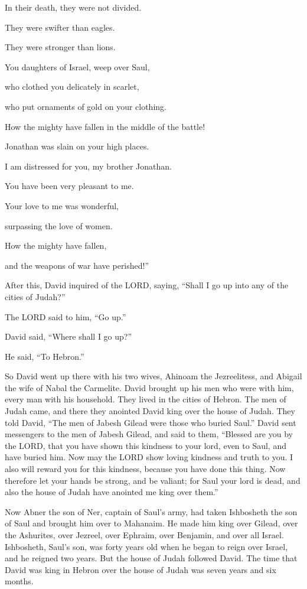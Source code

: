In their death, they were not divided.

They were swifter than eagles.

They were stronger than lions.

\myverse{}You daughters of Israel, weep over Saul,

who clothed you delicately in scarlet,

who put ornaments of gold on your clothing.

\myverse{}How the mighty have fallen in the middle of the battle!

Jonathan was slain on your high places.

\myverse{}I am distressed for you, my brother Jonathan.

You have been very pleasant to me.

Your love to me was wonderful,

surpassing the love of women.

\myverse{}How the mighty have fallen,

and the weapons of war have perished!”


\mychapter{} \myverse*{}After this, David inquired of the LORD, saying, “Shall I go up
into any of the cities of Judah?”

The LORD said to him, “Go up.”

David said, “Where shall I go up?”

He said, “To Hebron.”

\myverse{}So David went up there with his two wives, Ahinoam the Jezreelitess,
and Abigail the wife of Nabal the Carmelite.
\myverse{}David brought up his men who were with him, every man with his household. They
lived in the cities of Hebron.
\myverse{}The men of Judah came, and there they anointed David king over the house of
Judah. They told David, “The men of Jabesh Gilead were those who buried Saul.”
\myverse{}David sent messengers to the men of Jabesh Gilead, and said to them, “Blessed
are you by the LORD, that you have shown this kindness to your lord, even to Saul, and have buried him.
\myverse{}Now may the LORD show loving kindness and truth to you. I also will reward you
for this kindness, because you have done this thing.
\myverse{}Now therefore let your hands be strong, and be valiant; for Saul your lord is
dead, and also the house of Judah have anointed me king over them.”

\myverse{}Now Abner the son of Ner, captain of Saul’s army, had taken Ishbosheth
the son of Saul and brought him over to Mahanaim.
\myverse{}He made him king over Gilead, over the Ashurites, over Jezreel, over Ephraim,
over Benjamin, and over all Israel.
\myverse{}Ishbosheth, Saul’s son, was forty years old when he began to reign over Israel,
and he reigned two years. But the house of Judah followed David.
\myverse{}The time that David was king in Hebron over the house of Judah was seven years
and six months.

